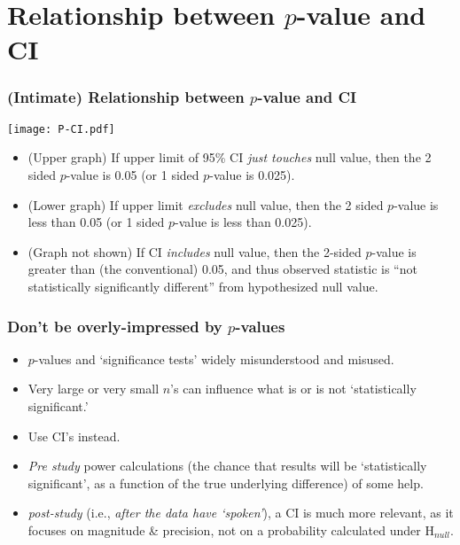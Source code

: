\documentclass[10pt,handout]{beamer}\usepackage[]{graphicx}\usepackage[]{color}
\begin{document}
\section{Relationship between $p$-value and CI}

\begin{frame}
	\frametitle{(Intimate) Relationship between $p$-value and CI}
	\begin{center}
		\texttt{[image: P-CI.pdf]}
	\end{center} 
	\begin{footnotesize}
		\begin{itemize}
			\item
			(Upper graph) If upper limit of 95\% CI\textit{ just touches} null value, then
			the 2 sided $p$-value is 0.05 (or 1 sided $p$-value is 0.025). \pause
			\item
			(Lower graph) If upper limit \textit{excludes} null value, then
			the 2 sided $p$-value is less than 0.05 (or 1 sided $p$-value is less than 0.025). \pause
			\item
			(Graph not shown) If  CI \textit{includes} null value, then the 2-sided $p$-value is greater than (the conventional) 0.05, and thus observed statistic is ``not statistically significantly different'' from hypothesized null value. 
		\end{itemize}
	\end{footnotesize}
\end{frame}

\begin{frame}
	\frametitle{Don't be overly-impressed by $p$-values}
	\begin{itemize}
		\setlength\itemsep{0.5em}
		\item
		$p$-values and `significance tests' widely misunderstood and misused.
		\item
		Very large or very small $n$'s can influence what is or is not `statistically significant.'
		\item
		Use CI's instead.
		\item
		\textit{Pre study} power calculations (the chance that results will be `statistically significant', as a
		function of the true underlying difference) of some help.
		\item
		\textit{post-study} (i.e., \textit{after the data have `spoken'}), a CI is much more relevant,
		as it focuses on magnitude \& precision, not on a probability calculated under H$_{null}.$
	\end{itemize}
\end{frame}
\end{document}
